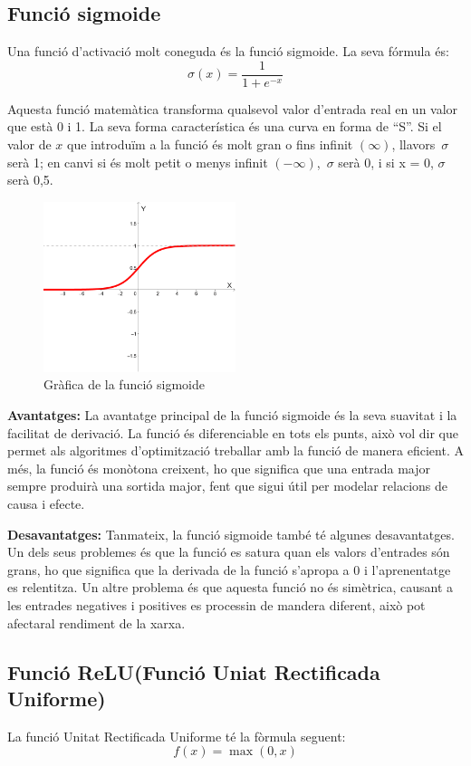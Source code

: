 \subsection{Funció sigmoide}
Una funció d'activació molt coneguda és la funció sigmoide. La seva fórmula és:
\[ \sigma(x) = \frac{1}{1 + e^{-x}} \]

Aquesta funció matemàtica transforma qualsevol valor d'entrada real en un valor que està 0 i 1. La seva forma característica és una curva en forma de ``S''. Si el valor de $x$ que introduïm a la funció és molt gran o fins infinit $(\infty)$, llavors\ $\sigma$ serà 1; en canvi si és molt petit o menys infinit $(-\infty)$,\ $\sigma$ serà 0, i si x = 0,  $\sigma$  serà 0,5.

\begin{figure}[h!]
    \centering
    \includegraphics[width=0.5\textwidth]{./figures/grafica_sigmoide.png}
    \caption{Gràfica de la funció sigmoide}
\end{figure}

\textbf{Avantatges:}
La avantatge principal de la funció sigmoide és la seva suavitat i la facilitat de derivació. La funció és diferenciable en tots els punts, això vol dir que permet als algoritmes d'optimització treballar amb la funció de manera eficient. A més, la funció és monòtona creixent, ho que significa que una entrada major sempre produirà una sortida major, fent que sigui útil per modelar relacions de causa i efecte.

\textbf{Desavantatges:}
Tanmateix, la funció sigmoide també té algunes desavantatges. Un dels seus problemes és que la funció es satura quan els valors d'entrades són grans, ho que significa que la derivada de la funció s'apropa a 0 i l'aprenentatge es relentitza. Un altre problema és que aquesta funció no és simètrica, causant a les entrades negatives i positives es processin de mandera diferent, això pot afectaral rendiment de la xarxa.
\subsection{Funció ReLU(Funció Uniat Rectificada Uniforme)}
La funció Unitat Rectificada Uniforme té la fòrmula seguent:
\[ f(x) = \max(0, x) \]


